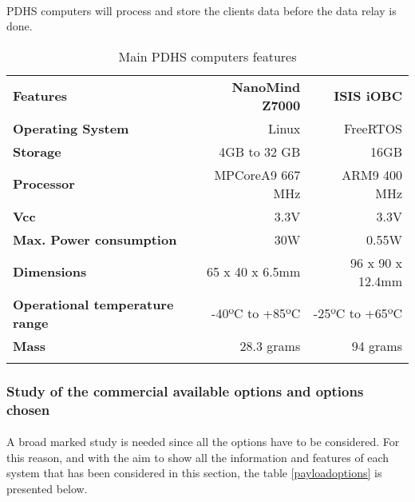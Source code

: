 \paragraph{} PDHS computers will process and store the clients data before the data relay is done.

\begin{longtable}{| l | r | r |}
	
	\hline
	\rowcolor[gray]{0.60} \multicolumn{3}{|c|}{\textbf{PDHS computers options}}\\
	\hline
		
	\hline
	\rowcolor[gray]{0.75}	\textbf{Features} &  \textbf{NanoMind Z7000} & \textbf{ISIS iOBC} \\
	\hline
		
	\cellcolor[gray]{0.85} \textbf{Operating System} & Linux  & FreeRTOS\\
	\cellcolor[gray]{0.85} \textbf{Storage} & 4GB to 32 GB& 16GB\\
	\cellcolor[gray]{0.85} \textbf{Processor} & MPCoreA9 667 MHz& ARM9 400 MHz\\
	\cellcolor[gray]{0.85} \textbf{Vcc} & 3.3V&3.3V \\
	\cellcolor[gray]{0.85} \textbf{Max. Power consumption} & 30W& 0.55W\\
	\cellcolor[gray]{0.85} \textbf{Dimensions} & 65 x 40 x 6.5mm & 96 x 90 x 12.4mm\\
	\cellcolor[gray]{0.85} \textbf{Operational temperature range} & -40ºC to +85ºC & -25ºC to +65ºC\\
	\cellcolor[gray]{0.85} \textbf{Mass} & 28.3 grams&94 grams \\
	\hline
		
		\caption{Main PDHS computers features}
		\label{computers}
		
	\end{longtable}
	



\subsubsection{Study of the commercial available options and options chosen}
\paragraph{}A broad marked study is needed since all the options have to be considered. For this reason, and with the aim to show all the information and features of each system that has been considered in this section, the table \ref{payloadoptions} is presented below.

